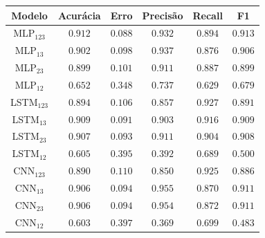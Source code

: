 \documentclass[a4paper,fleqn]{cas-sc}
\begin{document}
\hfill
\begin{minipage}{0.45\textwidth}
	\vspace{0.5cm}
	\begingroup
	\begin{tiny}	
		\setlength{\tabcolsep}{3pt}
		\renewcommand{\arraystretch}{1.15}
		
		
		\begin{tabular*}{\textwidth}{@{} CCCCCC@{} }
			\toprule
			Modelo&Acurácia&Erro&Precisão&Recall&F1 \\
			\midrule
				MLP$_{123}$ & $0.912$ & $0.088$ & $0.932$ & $0.894$ & $0.913$ \\
				MLP$_{13}$ & $0.902$ & $0.098$ & $0.937$ & $0.876$ & $0.906$ \\
				MLP$_{23}$ & $0.899$ & $0.101$ & $0.911$ & $0.887$ & $0.899$ \\
				MLP$_{12}$ & $0.652$ & $0.348$ & $0.737$ & $0.629$ & $0.679$ \\
				LSTM$_{123}$ & $0.894$ & $0.106$ & $0.857$ & $0.927$ & $0.891$ \\
				LSTM$_{13}$ & $0.909$ & $0.091$ & $0.903$ & $0.916$ & $0.909$ \\
				LSTM$_{23}$ & $0.907$ & $0.093$ & $0.911$ & $0.904$ & $0.908$ \\
				LSTM$_{12}$ & $0.605$ & $0.395$ & $0.392$ & $0.689$ & $0.500$ \\
				CNN$_{123}$ & $0.890$ & $0.110$ & $0.850$ & $0.925$ & $0.886$ \\
				CNN$_{13}$ & $0.906$ & $0.094$ & $0.955$ & $0.870$ & $0.911$ \\
				CNN$_{23}$ & $0.906$ & $0.094$ & $0.954$ & $0.872$ & $0.911$ \\
				CNN$_{12}$ & $0.603$ & $0.397$ & $0.369$ & $0.699$ & $0.483$ \\    		
			\bottomrule
		\end{tabular*}
		\vspace{-0.3cm}
		\label{tab:metricas_500Mbps_teste}
	\end{tiny}
	\endgroup
\end{minipage}
\hfill
\end{document}
